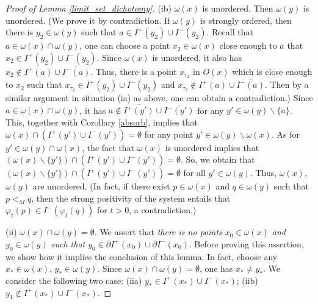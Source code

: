 \documentclass[a4paper,11pt]{article}
\theoremstyle{plain}
\theoremstyle{definition}
\numberwithin{equation}{section}
\begin{document}
\begin{proof}[Proof of Lemma \ref{limit_set_dichotomy}]
    
    (ib) $\omega(x)$ is unordered. Then $\omega(y)$ is unordered. (We prove it by contradiction. If $\omega(y)$ is strongly ordered, then there is $y_2\in \omega(y)$ such that $a\in I^{+}(y_2)\cup I^{-}(y_2)$. Recall that $a\in \omega(x)\cap\omega(y)$, one can choose a point $x_2\in \omega(x)$ close enough to $a$ that $x_2\in I^{+}(y_2)\cup I^{-}(y_2)$. Since $\omega(x)$ is unordered, it also has $x_2\notin\overline{I^{+}(a)}\cup \overline{I^{-}(a)}$. Thus, there is a point $x_{\tau_2}$ in $O(x)$ which is close enough to $x_2$ such that $x_{\tau_2}\in I^{+}(y_2)\cup I^{-}(y_2)$ and $x_{\tau_2}\notin\overline{I^{+}(a)}\cup \overline{I^{-}(a)}$. Then by a similar argument in situation (ia) as above, one can obtain a contradiction.) Since $a\in \omega(x)\cap\omega(y)$, it has $a\notin \overline{I^{+}(y')}\cup \overline{I^{-}(y')}$ for any $y'\in \omega(y)\backslash\{a\}$. This, together with Corollary \ref{absorb}, implies that $\omega(x) \cap (I^{+}(y')\cup I^{-}(y'))=\emptyset$ for any point $y'\in \omega(y)\backslash \omega(x)$. As for $y'\in \omega(y)\cap \omega(x)$, the fact that $\omega(x)$ is unordered implies that $(\omega(x)\backslash \{y'\}) \cap (I^{+}(y')\cup I^{-}(y'))=\emptyset$. So, we obtain that $(\omega(x)\backslash \{y'\}) \cap (I^{+}(y')\cup I^{-}(y'))=\emptyset$ for all $y'\in \omega(y)$. Thus, $\omega(x)$, $\omega(y)$ are unordered. (In fact, if there exist $p\in \omega(x)$ and $q\in \omega(y)$ such that $p<_M q$, then the strong positivity of the system entails that $\varphi_{t}(p)\in I^{-}(\varphi_{t}(q))$ for $t>0$, a contradiction.)

    (ii) $\omega(x)\cap\omega(y)=\emptyset$. We assert that \emph{there is no points $x_{0}\in\omega(x)$ and $y_{0}\in\omega(y)$ such that $y_{0}\in \partial I^{+}(x_{0})\cup \partial I^{-}(x_{0})$}. 
	Before proving this assertion, we show how it implies the conclusion of this lemma.
	In fact, choose any $x_*\in\omega(x)$, $y_*\in\omega(y)$. Since $\omega(x)\cap\omega(y)=\emptyset$, one has $x_*\neq y_*$. We consider the following two case:
	(iia) $y_*\in I^{+}(x_*)\cup I^{-}(x_*)$; (iib) $y_1\notin I^{+}(x_*)\cup I^{-}(x_*)$.
		

\end{proof}
\end{document}
